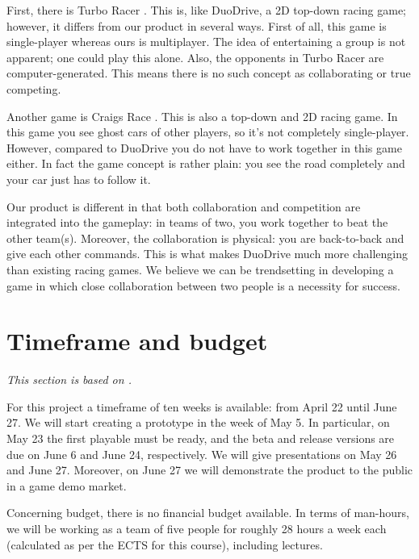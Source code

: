 \documentclass[11pt,twoside,a4paper]{article}
\begin{document}
First, there is Turbo Racer \cite{turboracer}. This is, like DuoDrive, a 2D top-down racing game; however, it differs from our product in several ways. First of all, this game is single-player whereas ours is multiplayer. The idea of entertaining a group is not apparent; one could play this alone. Also, the opponents in Turbo Racer are computer-generated. This means there is no such concept as collaborating or true competing.

Another game is Craigs Race \cite{craigsrace1} \cite{craigsrace2}. This is also a top-down and 2D racing game. In this game you see ghost cars of other players, so it's not completely single-player. However, compared to DuoDrive you do not have to work together in this game either. In fact the game concept is rather plain: you see the road completely and your car just has to follow it.

Our product is different in that both collaboration and competition are integrated into the gameplay: in teams of two, you work together to beat the other team(s). Moreover, the collaboration is physical: you are back-to-back and give each other commands. This is what makes DuoDrive much more challenging than existing racing games. We believe we can be trendsetting in developing a game in which close collaboration between two people is a necessity for success.


\section{Timeframe and budget}
{\itshape This section is based on \cite{gamesplanning}.}

For this project a timeframe of ten weeks is available: from April 22 until June 27. We will start creating a prototype in the week of May 5. In particular, on May 23 the first playable must be ready, and the beta and release versions are due on June 6 and June 24, respectively. We will give presentations on May 26 and June 27. Moreover, on June 27 we will demonstrate the product to the public in a game demo market.

Concerning budget, there is no financial budget available. In terms of man-hours, we will be working as a team of five people for roughly 28 hours a week each (calculated as per the ECTS for this course), including lectures.
\end{document}
